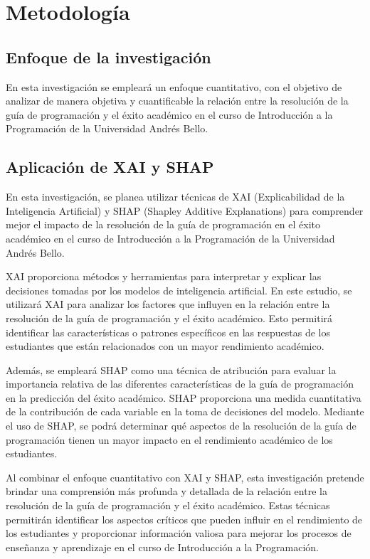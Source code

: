 \hypertarget{metodología}{%
  \section{Metodología}\label{Metodología}}

\subsection{Enfoque de la investigación}

En esta investigación se empleará un enfoque cuantitativo, con el objetivo de analizar de manera objetiva y cuantificable
la relación entre la resolución de la guía de programación y el éxito académico en el curso de Introducción a la
Programación de la Universidad Andrés Bello.

\subsection{Aplicación de XAI y SHAP}

En esta investigación, se planea utilizar técnicas de XAI (Explicabilidad de la Inteligencia Artificial) y SHAP (Shapley Additive Explanations) para comprender mejor el impacto de la resolución de la guía de programación en el éxito académico en el curso de Introducción a la Programación de la Universidad Andrés Bello.

XAI proporciona métodos y herramientas para interpretar y explicar las decisiones tomadas por los modelos de inteligencia artificial. En este estudio, se utilizará XAI para analizar los factores que influyen en la relación entre la resolución de la guía de programación y el éxito académico. Esto permitirá identificar las características o patrones específicos en las respuestas de los estudiantes que están relacionados con un mayor rendimiento académico.

Además, se empleará SHAP como una técnica de atribución para evaluar la importancia relativa de las diferentes características de la guía de programación en la predicción del éxito académico. SHAP proporciona una medida cuantitativa de la contribución de cada variable en la toma de decisiones del modelo. Mediante el uso de SHAP, se podrá determinar qué aspectos de la resolución de la guía de programación tienen un mayor impacto en el rendimiento académico de los estudiantes.

Al combinar el enfoque cuantitativo con XAI y SHAP, esta investigación pretende brindar una comprensión más profunda y detallada de la relación entre la resolución de la guía de programación y el éxito académico. Estas técnicas permitirán identificar los aspectos críticos que pueden influir en el rendimiento de los estudiantes y proporcionar información valiosa para mejorar los procesos de enseñanza y aprendizaje en el curso de Introducción a la Programación.

